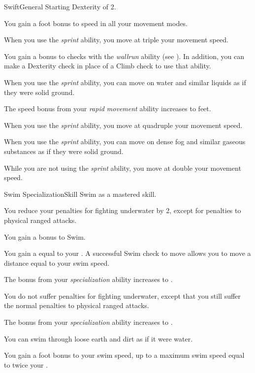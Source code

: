     \begin{feat}{Swift}{General}
        \featpre Starting Dexterity of 2.

         You gain a  foot bonus to speed in all your movement modes.

         When you use the \textit{sprint} ability, you move at triple your movement speed.

         You gain a  bonus to checks with the \textit{wallrun} ability (see ).
        In addition, you can make a Dexterity check in place of a Climb check to use that ability.

         When you use the \textit{sprint} ability, you can move on water and similar liquids as if they were solid ground.

         The speed bonus from your \textit{rapid movement} ability increases to  feet.

         When you use the \textit{sprint} ability, you move at quadruple your movement speed.

         When you use the \textit{sprint} ability, you can move on dense fog and similar gaseous substances as if they were solid ground.

         While you are not using the \textit{sprint} ability, you move at double your movement speed.
    \end{feat}

    \begin{feat}{Swim Specialization}{Skill}
        \featpre Swim as a mastered skill.

         You reduce your penalties for fighting underwater by 2, except for penalties to physical ranged attacks.

         You gain a  bonus to Swim.

         You gain a  equal to your .
        A successful Swim check to move allows you to move a distance equal to your swim speed.

         The bonus from your \textit{specialization} ability increases to .

         You do not suffer penalties for fighting underwater, except that you still suffer the normal penalties to physical ranged attacks.

         The bonus from your \textit{specialization} ability increases to .

         You can swim through loose earth and dirt as if it were water.

         You gain a  foot bonus to your swim speed, up to a maximum swim speed equal to twice your .
    \end{feat}

